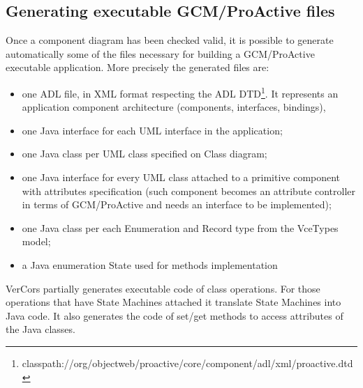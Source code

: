 \documentclass[12pt]{article}
\begin{document}
\subsection{Generating executable GCM/ProActive files}
Once a component diagram has been checked valid, it is possible to generate automatically some of the files necessary for building a GCM/ProActive executable application. More precisely the generated files are:
\begin{itemize}
\item
one ADL file, in XML format respecting the ADL DTD\footnote{classpath://org/objectweb/proactive/core/component/adl/xml/proactive.dtd}. It represents an application component architecture (components, interfaces, bindings),
\item
one Java interface for each UML interface in the application;
\item
one Java class per UML class specified on Class diagram;
\item
one Java interface for every UML class attached to a primitive component with attributes specification (such component becomes an attribute controller in terms of GCM/ProActive and needs an interface to be implemented);
\item
one Java class per each Enumeration and Record type from the VceTypes model;
\item
a Java enumeration State used for methods implementation
\end{itemize}

VerCors partially generates executable code of class operations. For those operations that have State Machines attached it translate State Machines into Java code. It also generates the code of set/get methods to access attributes of the Java classes.
\end{document}
